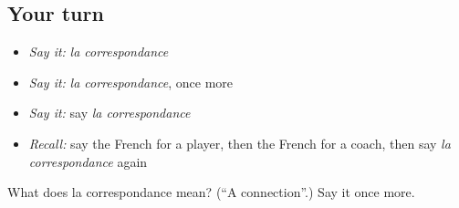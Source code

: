 \subsection*{Your turn}
\begin{itemize}
\raggedright
  \item \emph{Say it:} \emph{la correspondance}
  \item \emph{Say it:} \emph{la correspondance}, once more
  \item \emph{Say it:} say \emph{la correspondance}
  \item \emph{Recall:} say the French for a player, then the French for a coach, then say \emph{la correspondance} again
\end{itemize}

\begin{tcolorbox}[breakable,colback=teal!4,colframe=teal!35!black,title={Before you move on}]
What does la correspondance mean? (\textquotedblleft{}A connection\textquotedblright{}.) Say it once more.
\end{tcolorbox}
